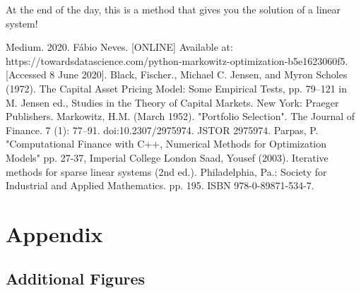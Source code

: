 \documentclass{article}
\begin{document}
At the end of the day, this is a method that gives you the solution of a linear system!


\newpage

\begin{thebibliography}{}
\label{sec:thebibliography}
	 Medium. 2020. Fábio Neves. [ONLINE] Available at: https://towardsdatascience.com/python-markowitz-optimization-b5e1623060f5. [Accessed 8 June 2020].
	 Black, Fischer., Michael C. Jensen, and Myron Scholes (1972). The Capital Asset Pricing Model: Some Empirical Tests, pp. 79–121 in M. Jensen ed., Studies in the Theory of Capital Markets. New York: Praeger Publishers.
	 Markowitz, H.M. (March 1952). "Portfolio Selection". The Journal of Finance. 7 (1): 77–91. doi:10.2307/2975974. JSTOR 2975974.
	 Parpas, P. "Computational Finance with C++, Numerical Methods for Optimization Models" pp. 27-37, Imperial College London
	 Saad, Yousef (2003). Iterative methods for sparse linear systems (2nd ed.). Philadelphia, Pa.: Society for Industrial and Applied Mathematics. pp. 195. ISBN 978-0-89871-534-7.
	
	
	
\end{thebibliography} 



\section{Appendix} 
\label{sec:appendix}

\subsection{Additional Figures} 
\label{sec:add_figs}
\end{document}
